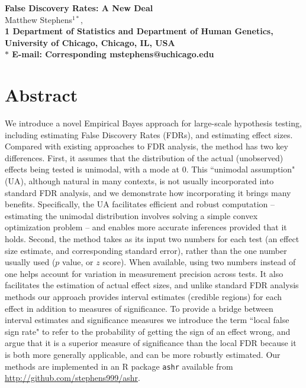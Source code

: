 \documentclass[11pt]{article}
\date{}
\begin{document}
\begin{flushleft}
{\Large
\textbf{False Discovery Rates: A New Deal}
}
\\
Matthew Stephens$^{1*}$, 
\\
\bf{1} Department of Statistics and Department of Human Genetics, University of Chicago, Chicago, IL, USA
\\
$\ast$ E-mail: Corresponding mstephens@uchicago.edu
\end{flushleft}

\section*{Abstract}

We introduce a novel Empirical Bayes approach for large-scale hypothesis testing, including  
estimating False Discovery Rates (FDRs), and estimating effect sizes. Compared with
existing approaches to FDR analysis, the method has two key differences. First, it
assumes that the distribution of the actual (unobserved) effects being tested is unimodal, with a mode at 0.
This ``unimodal assumption" (UA), although natural in many contexts, is not usually incorporated into standard FDR analysis,
and we demonstrate how incorporating it brings many benefits.  Specifically, the UA
facilitates efficient and robust computation -- estimating the unimodal distribution involves solving a simple convex optimization problem --
and enables more accurate inferences provided that it holds.
Second, the method takes as its input two numbers for each test (an effect size estimate, and corresponding standard error),
rather than the one number usually used ($p$ value, or $z$ score). When available, using two numbers instead of one 
helps account for variation in measurement precision across tests. It also facilitates the estimation of actual 
effect sizes, and unlike standard FDR analysis methods
our approach provides interval estimates (credible regions) for each effect in addition to measures of significance.
To provide a bridge between interval estimates and significance measures we introduce the term ``local false sign rate"
to refer to the probability of getting the sign of an effect wrong, and argue that it is a superior
measure of significance than the local FDR because it is both more generally applicable, and
can be more robustly estimated. Our methods are implemented in an R package {\tt ashr}
available from \url{http://github.com/stephens999/ashr}. 
\end{document}
